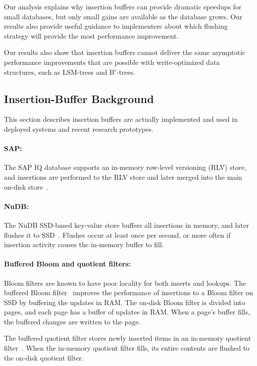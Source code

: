 Our analysis explains why insertion buffers can provide dramatic speedups for
small databases, but only small gains are available as the database grows.  Our
results also provide useful guidance to implementers about which flushing
strategy will provide the most performance improvement.

Our results also show that insertion buffers cannot deliver the same asymptotic
performance improvements that are possible with write-optimized data
structures, such as LSM-trees and B$^\epsilon$-trees.

\subsection{Insertion-Buffer Background}\label{sec:br-exp-deployed}

This section describes insertion buffers are actually implemented and used in
deployed systems and recent research prototypes.

\paragraph{SAP:} The SAP IQ database supports an in-memory row-level versioning
(RLV) store, and insertions are performed to the RLV store and later merged
into the main on-disk store~\cite{SAP17}.  

\paragraph{NuDB:}  The NuDB SSD-based key-value store buffers all insertions in
memory, and later flushes it to SSD~\cite{NuDB16}.  Flushes occur at least once
per second, or more often if insertion activity causes the in-memory buffer to
fill.

\paragraph{Buffered Bloom and quotient filters:}  Bloom filters are known to
have poor locality for both inserts and lookups.  The buffered Bloom
filter~\cite{DBLP:conf/vldb/CanimMBLR10} improves the performance of insertions to a Bloom
filter on SSD by buffering the updates in RAM.  The on-disk Bloom filter is
divided into pages, and each page has a buffer of updates in RAM.  When a
page's buffer fills, the buffered changes are written to the page.  

The buffered quotient filter stores newly inserted items in an in-memory
quotient filter~\cite{DBLP:journals/pvldb/BenderFJKKMMSSZ12,DBLP:conf/focs/BenderFGJM018}.  When the in-memory
quotient filter fills, its entire contents are flushed to the on-disk quotient
filter.

